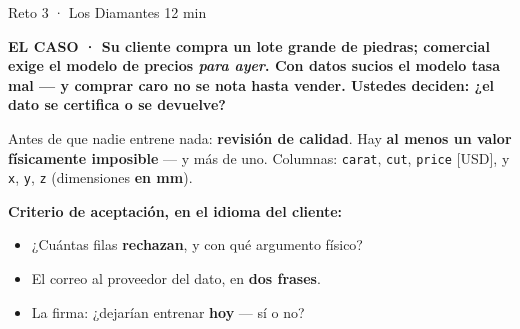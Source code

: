 \documentclass[aspectratio=169, 11pt]{beamer}
\begin{document}
\begin{frame}[shrink=8]{\faTools\hspace{4pt}Reto 3 · Los Diamantes \hfill {\normalsize\color{arcaRed}\faClock\hspace{4pt}12 min}}
  \vspace{-4pt}
  \begin{tcolorbox}[colback=arcaGray, colframe=arcaRed, boxrule=0pt,
    leftrule=3pt, arc=3pt, left=7pt, right=7pt, top=2pt, bottom=2pt]
    {\scriptsize\color{arcaRed}\bfseries EL CASO ·
     \color{textMuted}\mdseries
     Su cliente compra un \textbf{lote grande de piedras}; comercial exige
     el modelo de precios \emph{para ayer}. Con datos sucios el modelo
     \textbf{tasa mal} --- y comprar caro no se nota hasta vender. Ustedes
     deciden: ¿el dato se \textbf{certifica} o se \textbf{devuelve}?}
  \end{tcolorbox}
  \vspace{2pt}
  \begin{encargo}
    {\scriptsize\color{textMuted}
     Antes de que nadie entrene nada: \textbf{revisión de calidad}. Hay
     \textbf{al menos un valor físicamente imposible} --- y más de uno.
     Columnas: \texttt{carat}, \texttt{cut}, \texttt{price} [USD], y
     \texttt{x}, \texttt{y}, \texttt{z} (dimensiones \textbf{en mm}).}
  \end{encargo}
  \vspace{2pt}
  {\scriptsize\color{textMuted}
   \textbf{Criterio de aceptación, en el idioma del cliente:}
  \begin{itemize}\setlength{\itemsep}{1pt}
    \item[{\color{arcaRed}\scriptsize\faQuestion}]
      ¿Cuántas filas \textbf{rechazan}, y con qué argumento físico?
    \item[{\color{arcaRed}\scriptsize\faQuestion}]
      El correo al proveedor del dato, en \textbf{dos frases}.
    \item[{\color{arcaRed}\scriptsize\faQuestion}]
      La firma: ¿dejarían entrenar \textbf{hoy} --- sí o no?
  \end{itemize}}
\end{frame}
\end{document}
